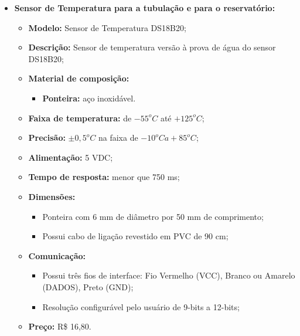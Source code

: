 \begin{itemize}
	\item \textbf{ Sensor de Temperatura para a tubulação e para o reservatório:}
	\begin{itemize}
		\item\textbf{ Modelo:} Sensor de Temperatura DS18B20;
		\item \textbf{ Descrição:} Sensor de temperatura versão à prova de água do sensor DS18B20; 
		\item\textbf{ Material de composição:}
		\begin{itemize}
			\item\textbf{ Ponteira:} aço inoxidável.
		\end{itemize}
		\item\textbf{ Faixa de temperatura:} de $ -55^oC$ até $+125^oC$;
		\item \textbf{ Precisão:} $\pm0,5^oC$ na faixa de $-10^oC a +85^oC$; 
		\item \textbf{ Alimentação:} 5 VDC;
		\item \textbf{ Tempo de resposta:} menor que 750 ms;
		\item \textbf{ Dimensões:}
		\begin{itemize}
			\item Ponteira com 6 mm de diâmetro por 50 mm de comprimento;
			\item Possui cabo de ligação revestido em PVC de 90 cm;
		\end{itemize}
		\item \textbf{ Comunicação:}
		\begin{itemize}
			\item Possui três fios de interface: Fio Vermelho (VCC), Branco ou Amarelo (DADOS), Preto (GND);
			\item Resolução configurável pelo usuário de 9-bits a 12-bits;
		\end{itemize}
		
		\item \textbf{ Preço:} R\$ 16,80.
\end{itemize}
\end{itemize}
